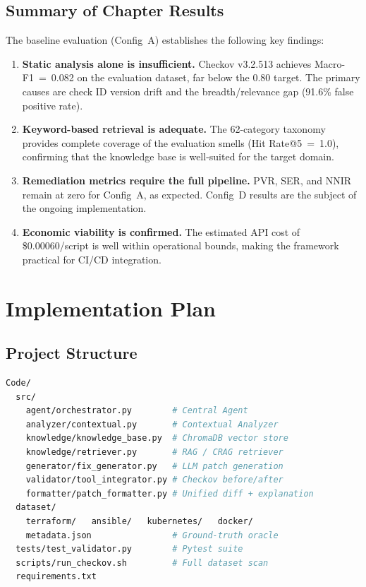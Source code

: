 \documentclass[12pt, a4paper]{report}
\begin{document}
\section{Summary of Chapter Results}

The baseline evaluation (Config~A) establishes the following key findings:

\begin{enumerate}
  \item \textbf{Static analysis alone is insufficient.} Checkov v3.2.513 achieves
  Macro-F1~=~0.082 on the evaluation dataset, far below the 0.80 target.
  The primary causes are check ID version drift and the breadth/relevance gap
  (91.6\% false positive rate).

  \item \textbf{Keyword-based retrieval is adequate.} The 62-category taxonomy
  provides complete coverage of the evaluation smells (Hit Rate@5~=~1.0),
  confirming that the knowledge base is well-suited for the target domain.

  \item \textbf{Remediation metrics require the full pipeline.} PVR, SER, and
  NNIR remain at zero for Config~A, as expected. Config~D results are the
  subject of the ongoing implementation.

  \item \textbf{Economic viability is confirmed.} The estimated API cost of
  \$0.00060/script is well within operational bounds, making the framework
  practical for CI/CD integration.
\end{enumerate}

\chapter{Implementation Plan}
\label{chap:implementation}

\section{Project Structure}

\begin{lstlisting}[language=bash, caption={Project directory structure.},
  label={lst:structure}]
Code/
  src/
    agent/orchestrator.py        # Central Agent
    analyzer/contextual.py       # Contextual Analyzer
    knowledge/knowledge_base.py  # ChromaDB vector store
    knowledge/retriever.py       # RAG / CRAG retriever
    generator/fix_generator.py   # LLM patch generation
    validator/tool_integrator.py # Checkov before/after
    formatter/patch_formatter.py # Unified diff + explanation
  dataset/
    terraform/   ansible/   kubernetes/   docker/
    metadata.json                # Ground-truth oracle
  tests/test_validator.py        # Pytest suite
  scripts/run_checkov.sh         # Full dataset scan
  requirements.txt
\end{lstlisting}
\end{document}
